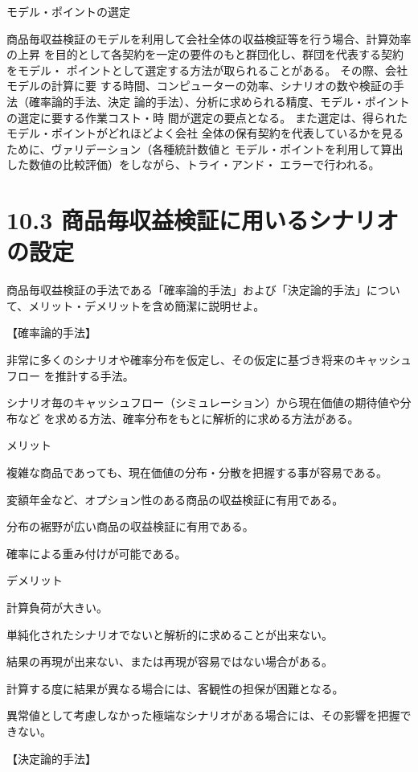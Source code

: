 \documentclass[report,gutter=10mm,fore-edge=10mm,uplatex,dvipdfmx]{jlreq}
\begin{document}
 モデル・ポイントの選定

商品毎収益検証のモデルを利用して会社全体の収益検証等を行う場合、計算効率の上昇
を目的として各契約を一定の要件のもと群団化し、群団を代表する契約をモデル・
ポイントとして選定する方法が取られることがある。
その際、会社モデルの計算に要
する時間、コンピューターの効率、シナリオの数や検証の手法（確率論的手法、決定
論的手法）、分析に求められる精度、モデル・ポイントの選定に要する作業コスト・時
間が選定の要点となる。
また選定は、得られたモデル・ポイントがどれほどよく会社
全体の保有契約を代表しているかを見るために、ヴァリデーション（各種統計数値と
モデル・ポイントを利用して算出した数値の比較評価）をしながら、トライ・アンド・
エラーで行われる。

\section{10.3 商品毎収益検証に用いるシナリオの設定}
商品毎収益検証の手法である「確率論的手法」および「決定論的手法」について、メリット・デメリットを含め簡潔に説明せよ。

\answer{}

【確率論的手法】

非常に多くのシナリオや確率分布を仮定し、その仮定に基づき将来のキャッシュフロー
を推計する手法。

シナリオ毎のキャッシュフロー（シミュレーション）から現在価値の期待値や分布など
を求める方法、確率分布をもとに解析的に求める方法がある。

メリット

複雑な商品であっても、現在価値の分布・分散を把握する事が容易である。

変額年金など、オプション性のある商品の収益検証に有用である。

分布の裾野が広い商品の収益検証に有用である。

確率による重み付けが可能である。


デメリット

計算負荷が大きい。

単純化されたシナリオでないと解析的に求めることが出来ない。

結果の再現が出来ない、または再現が容易ではない場合がある。

計算する度に結果が異なる場合には、客観性の担保が困難となる。

異常値として考慮しなかった極端なシナリオがある場合には、その影響を把握できない。

【決定論的手法】
\end{document}
